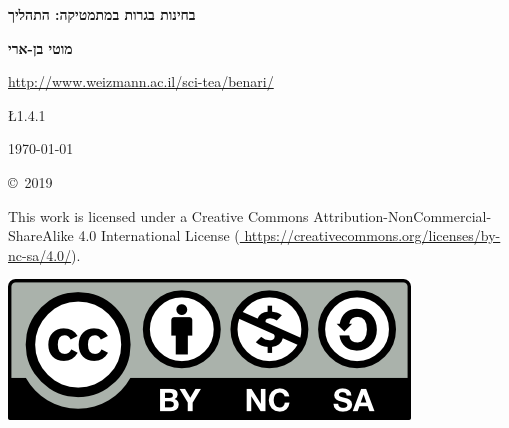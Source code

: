 

\thispagestyle{empty}

\begin{center}
\textbf{\LARGE בחינות בגרות במתמטיקה: התהליך}
\end{center}

\bigskip
\bigskip

\begin{center}
\textbf{\Large מוטי בן-ארי}

\bigskip

\url{http://www.weizmann.ac.il/sci-tea/benari/}
\end{center}

\begin{center}	
\begin{bfseries}
\bigskip
\bigskip

 \L{1.4.1} 

\bigskip

\today

\end{bfseries}
\end{center}

\vfill


\begin{small}
\begin{center}
\copyright{}\ 2019 
\end{center}
This work is licensed under a Creative Commons Attribution-NonCommercial-ShareAlike 4.0 International License (\url{
https://creativecommons.org/licenses/by-nc-sa/4.0/}).
\end{small}

\bigskip

\begin{center}
\includegraphics[width=.3\textwidth]{../../by-nc-sa.png}
\end{center}

\np

\thispagestyle{empty}

\mbox{}

\np

\thispagestyle{empty}

\tableofcontents

